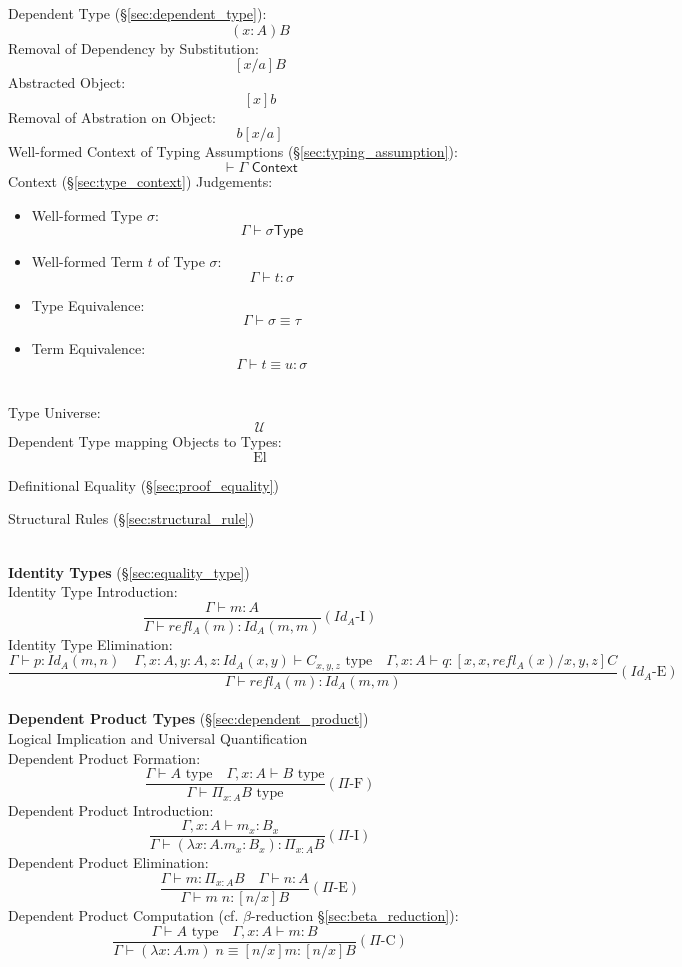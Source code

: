 Dependent Type (\S\ref{sec:dependent_type}):
\[
  (x:A)B
\]
Removal of Dependency by Substitution:
\[
  [x/a]B
\]
Abstracted Object:
\[
  [x]b
\]
Removal of Abstration on Object:
\[
  b[x/a]
\]
Well-formed Context of Typing Assumptions
(\S\ref{sec:typing_assumption}):
\[
  \vdash \Gamma \textsf{ Context}
\]
Context (\S\ref{sec:type_context}) Judgements:
\begin {itemize}
\item Well-formed Type $\sigma$:
  \[
    \Gamma \vdash \sigma \mathsf{ Type}
  \]
\item Well-formed Term $t$ of Type $\sigma$:
  \[
    \Gamma \vdash t : \sigma
  \]
\item Type Equivalence:
  \[
    \Gamma \vdash \sigma \equiv \tau
  \]
\item Term Equivalence:
  \[
    \Gamma \vdash t \equiv u : \sigma
  \]
\end {itemize}
\hfill\\
Type Universe:
\[
  \mathcal{U}
\]
Dependent Type mapping Objects to Types:
\[
  \textrm{El}
\]

Definitional Equality (\S\ref{sec:proof_equality})

Structural Rules (\S\ref{sec:structural_rule})



\hfill \\
\textbf{Identity Types} (\S\ref{sec:equality_type})
\\
Identity Type Introduction:
\[
  \frac{
    \Gamma \vdash m : A
  }{
    \Gamma \vdash refl_A(m) : Id_A(m,m)
  } (Id_A\text{-I})
\]
Identity Type Elimination:
\[
  \frac{
    \Gamma \vdash p : Id_A (m,n) \quad
    \Gamma, x:A, y:A, z : Id_A(x,y) \vdash C_{x,y,z} \text{ type}\quad
    \Gamma, x : A \vdash q : [x, x, refl_A(x)/x,y,z]C
  }{
    \Gamma \vdash refl_A(m) : Id_A(m,m)
  } (Id_A\text{-E})
\]
\hfill \\
\textbf{Dependent Product Types} (\S\ref{sec:dependent_product})
\\
Logical Implication and Universal Quantification
\\
Dependent Product Formation:
\[
  \frac{
    \Gamma \vdash A \text{ type} \quad
    \Gamma, x:A \vdash B \text{ type}
  }{
    \Gamma \vdash \Pi_{x:A} B \text{ type}
  } (\Pi\text{-F})
\]
Dependent Product Introduction:
\[
  \frac{
    \Gamma, x : A \vdash m_x : B_x \quad
  }{
    \Gamma \vdash (\lambda x:A.m_x : B_x) : \Pi_{x:A} B
  } (\Pi\text{-I})
\]
Dependent Product Elimination:
\[
  \frac{
    \Gamma \vdash m : \Pi_{x:A} B \quad
    \Gamma \vdash n : A
  }{
    \Gamma \vdash m\;n : [n/x]B
  } (\Pi\text{-E})
\]
Dependent Product Computation (cf. $\beta$-reduction
\S\ref{sec:beta_reduction}):
\[
  \frac{
    \Gamma \vdash A \text{ type} \quad
    \Gamma , x : A \vdash m : B
  }{
    \Gamma \vdash (\lambda x : A.m)\;n \equiv [n/x]m : [n/x]B
  } (\Pi\text{-C})
\]


